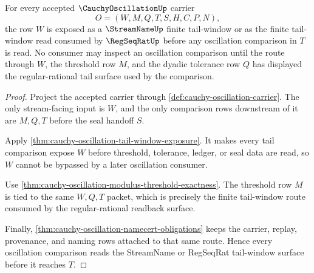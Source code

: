 \begin{theorem}
\label{thm:cauchy-oscillation-regseqrat-handoff}
For every accepted $\CauchyOscillationUp$ carrier
$$
O=(W,M,Q,T,S,H,C,P,N),
$$
the row $W$ is exposed as a $\StreamNameUp$ finite tail-window or as the finite tail-window read consumed by $\RegSeqRatUp$ before any oscillation comparison in $T$ is read. No consumer may inspect an oscillation comparison until the route through $W$, the threshold row $M$, and the dyadic tolerance row $Q$ has displayed the regular-rational tail surface used by the comparison.
\end{theorem}
\begin{proof}
Project the accepted carrier through \autoref{def:cauchy-oscillation-carrier}. The only stream-facing input is $W$, and the only comparison rows downstream of it are $M,Q,T$ before the seal handoff $S$.

Apply \autoref{thm:cauchy-oscillation-tail-window-exposure}. It makes every tail comparison expose $W$ before threshold, tolerance, ledger, or seal data are read, so $W$ cannot be bypassed by a later oscillation consumer.

Use \autoref{thm:cauchy-oscillation-modulus-threshold-exactness}. The threshold row $M$ is tied to the same $W,Q,T$ packet, which is precisely the finite tail-window route consumed by the regular-rational readback surface.

Finally, \autoref{thm:cauchy-oscillation-namecert-obligations} keeps the carrier, replay, provenance, and naming rows attached to that same route. Hence every oscillation comparison reads the StreamName or RegSeqRat tail-window surface before it reaches $T$.
\end{proof}

